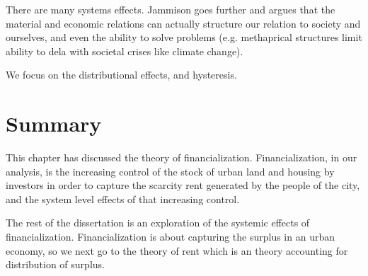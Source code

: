 There are many systems effects.
Jammison goes further and argues that the material and economic relations can actually structure our relation to society and ourselves, and even the ability to solve problems (e.g. methaprical structures limit ability to dela with societal crises like climate change).


We focus on the distributional effects, and hysteresis.

\section{Summary} %

This chapter has discussed the theory of financialization.
Financialization, in our analysis, is the increasing control of the stock of urban land and housing by investors in order to capture the scarcity rent generated by the people of the city, and the system level effects of that increasing control.  

The rest of the dissertation is an exploration of the systemic effects of financialization. 
Financialization is about capturing the surplus in an urban economy, so we next go to the theory of rent which is an theory accounting for distribution of surplus. 